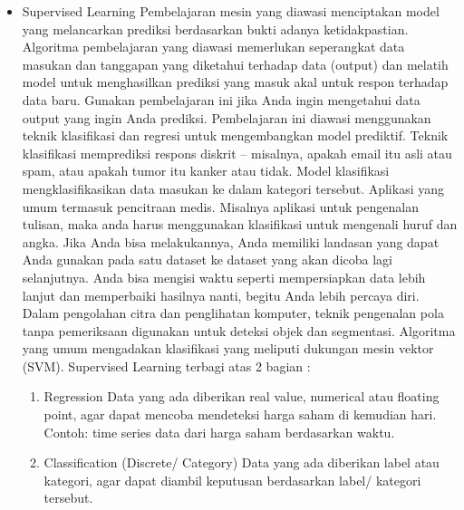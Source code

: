 \begin{itemize}
\item Supervised Learning
Pembelajaran mesin yang diawasi menciptakan model yang melancarkan prediksi berdasarkan bukti adanya ketidakpastian. Algoritma pembelajaran yang diawasi memerlukan seperangkat data masukan dan tanggapan yang diketahui terhadap data (output) dan melatih model untuk menghasilkan prediksi yang masuk akal untuk respon terhadap data baru. Gunakan pembelajaran ini jika Anda ingin mengetahui data output yang ingin Anda prediksi. Pembelajaran ini diawasi menggunakan teknik klasifikasi dan regresi untuk mengembangkan model prediktif.
Teknik klasifikasi memprediksi respons diskrit – misalnya, apakah email itu asli atau spam, atau apakah tumor itu kanker atau tidak. Model klasifikasi mengklasifikasikan data masukan ke dalam kategori tersebut. Aplikasi yang umum termasuk pencitraan medis. Misalnya aplikasi untuk pengenalan tulisan, maka anda harus menggunakan klasifikasi untuk mengenali huruf dan angka.
Jika Anda bisa melakukannya, Anda memiliki landasan yang dapat Anda gunakan pada satu dataset ke dataset yang akan dicoba lagi selanjutnya. Anda bisa mengisi waktu seperti mempersiapkan data lebih lanjut dan memperbaiki hasilnya nanti, begitu Anda lebih percaya diri. Dalam pengolahan citra dan penglihatan komputer, teknik pengenalan pola tanpa pemeriksaan digunakan untuk deteksi objek dan segmentasi. Algoritma yang umum mengadakan klasifikasi yang meliputi dukungan mesin vektor (SVM).
Supervised Learning terbagi atas 2 bagian :
\begin{enumerate}
\item Regression
Data yang ada diberikan real value, numerical atau floating point, agar dapat mencoba mendeteksi harga saham di kemudian hari. Contoh: time series data dari harga saham berdasarkan waktu.
\item Classification (Discrete/ Category)
Data yang ada diberikan label atau kategori, agar dapat diambil keputusan berdasarkan label/ kategori tersebut.
\end{enumerate}



\end{itemize}
